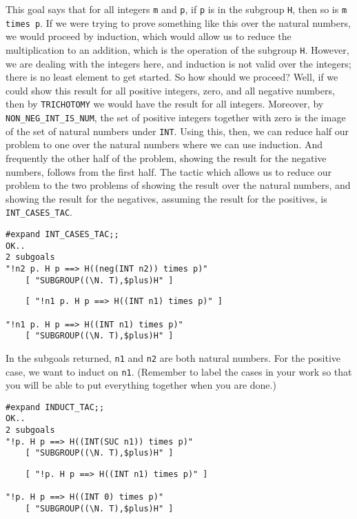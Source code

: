 This goal says that for all integers {\small\tt m} and {\small\tt p},
if {\small\tt p} is in the subgroup {\small\tt H}, then so is
{\small\verb+m times p+}.  If we were trying to prove something like
this over the natural numbers, we would proceed by induction, which
would allow us to reduce the multiplication to an addition, which is
the operation of the subgroup {\small\tt H}.  However, we are dealing
with the integers here, and induction is not valid over the integers;
there is no least element to get started.  So how should we proceed?
Well, if we could show this result for all positive integers, zero,
and all negative numbers, then by {\small\verb+TRICHOTOMY+} we would
have the result for all integers. Moreover, by
{\small\verb+NON_NEG_INT_IS_NUM+}, the set of positive integers
together with zero is the image of the set of natural numbers under
{\small\verb+INT+}.  Using this, then, we can reduce half our problem
to one over the natural numbers where we can use induction.  And
frequently the other half of the problem, showing the result for the
negative numbers, follows from the first half.  The tactic which
allows us to reduce our problem to the two problems of showing the
result over the natural numbers, and showing the result for the
negatives, assuming the result for the positives, is
{\small\verb+INT_CASES_TAC+}.
\begin{session}
\begin{verbatim}
#expand INT_CASES_TAC;;
OK..
2 subgoals
"!n2 p. H p ==> H((neg(INT n2)) times p)"
    [ "SUBGROUP((\N. T),$plus)H" ]
\end{verbatim}
\mvdots
\begin{verbatim}
    [ "!n1 p. H p ==> H((INT n1) times p)" ]

"!n1 p. H p ==> H((INT n1) times p)"
    [ "SUBGROUP((\N. T),$plus)H" ]
\end{verbatim}
\evdots
\end{session}

In the subgoals returned, {\small\tt n1} and {\small\tt n2} are both
natural numbers.  For the positive case, we want to induct on
{\small\tt n1}.  (Remember to label the cases in your work so that you
will be able to put everything together when you are done.) 
\begin{session}
\begin{verbatim}
#expand INDUCT_TAC;;
OK..
2 subgoals
"!p. H p ==> H((INT(SUC n1)) times p)"
    [ "SUBGROUP((\N. T),$plus)H" ]
\end{verbatim}
\mvdots
\begin{verbatim}
    [ "!p. H p ==> H((INT n1) times p)" ]

"!p. H p ==> H((INT 0) times p)"
    [ "SUBGROUP((\N. T),$plus)H" ]
\end{verbatim}
\evdots
\end{session}

